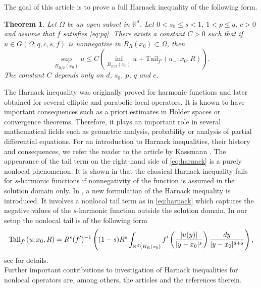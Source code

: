 \documentclass[11pt]{amsart}
\theoremstyle{plain}
\newtheorem{theorem}{Theorem}[section]
\theoremstyle{definition}
\numberwithin{equation}{section}
\renewcommand{\d}{\textnormal{d}}
\newcommand{\Rd}{\mathbb{R}^d}
\begin{document}
The goal of this article is to prove a full Harnack inequality of the following form.
\begin{theorem}
\label{thm:harnack}
Let $\Omega$ be an open subset in $\Rd$. Let $0 < s_0 \leq s < 1$, $1 < p \leq q$, $c > 0$ and assume that $f$ satisfies \eqref{eq:pq}. There exists a constant $C > 0$ such that if $u \in G(\Omega; q, c, s, f)$ is nonnegative in $B_{R}(x_0) \subset \Omega$, then
\begin{equation}
\label{eq:harnack}
\sup_{B_{R/2}(x_0)} u \leq C \left( \inf_{B_{R/2}(x_0)} u + \mathrm{Tail}_{f'}(u_-; x_0, R) \right).
\end{equation}
The constant $C$ depends only on $d$, $s_0$, $p$, $q$ and $c$.
\end{theorem}
The Harnack inequality was originally proved for harmonic functions and later obtained for several elliptic and parabolic local operators. It is known to have important consequences such as a priori estimates in H\"older spaces or convergence theorems. 
Therefore, it plays an important role in several mathematical fields such as geometric analysis, probability or analysis of partial differential equations. For an introduction to Harnack inequalities, their history and consequences, we refer the reader to the article by Kassmann \cite{KassmannHarnack}. 
The appearance of the tail term on the right-hand side of \eqref{eq:harnack} is a purely nonlocal phenomenon.
It is shown in \cite{Ka07} that the classical Harnack inequality fails for $s$-harmonic functions if nonnegativity of the function is assumed in the solution domain only. In \cite{Ka11}, a new formulation of the Harnack inequality is introduced. It involves a nonlocal tail term as in \eqref{eq:harnack} which captures the negative values of the $s$-harmonic function outside the solution domain.
In our setup the nonlocal tail is of the following form
\[ \mathrm{Tail}_{f'}(u; x_0, R) = R^s (f')^{-1} \left( (1-s)R^s \int_{\Rd \setminus B_R(x_0)} f' \left( \frac{|u(y)|}{|y-x_0|^s} \right) \frac{\d y}{|y-x_0|^{d+s}} \right),\]
see  for details.\\
Further important contributions to investigation of Harnack inequalities for nonlocal operators are, among others, the articles \cite{BaLe02, ChKu03, SoVo04, BaKa05, BoSz05, CaSi07, CaSi09, BaBaChKa09,  St13, DiKuPa14, Coz17, St19, ChKuWa19} and the references therein. 
\end{document}
